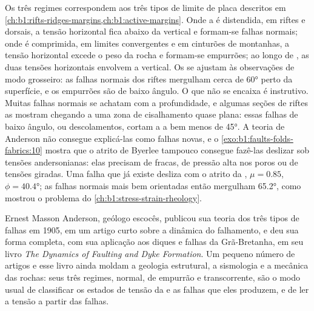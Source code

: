 Os três regimes correspondem aos três tipos de limite de placa descritos em
\cref{ch:b1:rifts-ridges-margins,ch:b1:active-margins}.
Onde a  é distendida, em riftes e dorsais, a tensão horizontal fica abaixo da vertical e formam-se falhas normais; onde é comprimida, em limites convergentes e em cinturões de montanhas, a tensão horizontal excede o peso da rocha e formam-se empurrões; ao longo de , as duas tensões horizontais envolvem a vertical. Os  se ajustam às observações de modo grosseiro: as falhas normais dos riftes mergulham cerca de \ang{60} perto da superfície, e os empurrões são  de baixo ângulo.
O que não se encaixa é instrutivo. Muitas falhas normais se achatam com a profundidade, e algumas seções de riftes as mostram chegando a uma zona de cisalhamento quase plana: essas falhas de baixo ângulo, ou descolamentos, cortam a  a bem menos de \ang{45}. A teoria de Anderson não consegue explicá-las como falhas novas, e o \cref{exo:b1:faults-folds-fabrics:10} mostra que o atrito de Byerlee tampouco consegue fazê-las deslizar sob tensões andersonianas: elas precisam de  fracas, de pressão alta nos poros ou de tensões giradas.
Uma falha que já existe desliza com o atrito da , $\mu = 0.85$, $\phi = \ang{40.4}$; as falhas normais mais bem orientadas então mergulham \ang{65.2}, como mostrou o problema do \cref{ch:b1:stress-strain-rheology}.

\begin{history}
Ernest Masson Anderson, geólogo escocês, publicou sua teoria dos três tipos de falhas em 1905, em um artigo curto sobre a dinâmica do falhamento, e deu sua forma completa, com sua aplicação aos diques e falhas da Grã-Bretanha, em seu livro \emph{The Dynamics of Faulting and Dyke Formation}. Um pequeno número de artigos e esse livro ainda moldam a geologia estrutural, a sismologia e a mecânica das rochas: seus três regimes, normal, de empurrão e transcorrente, são o modo usual de classificar os estados de tensão da  e as falhas que eles produzem, e de ler a tensão a partir das falhas.
\end{history}

